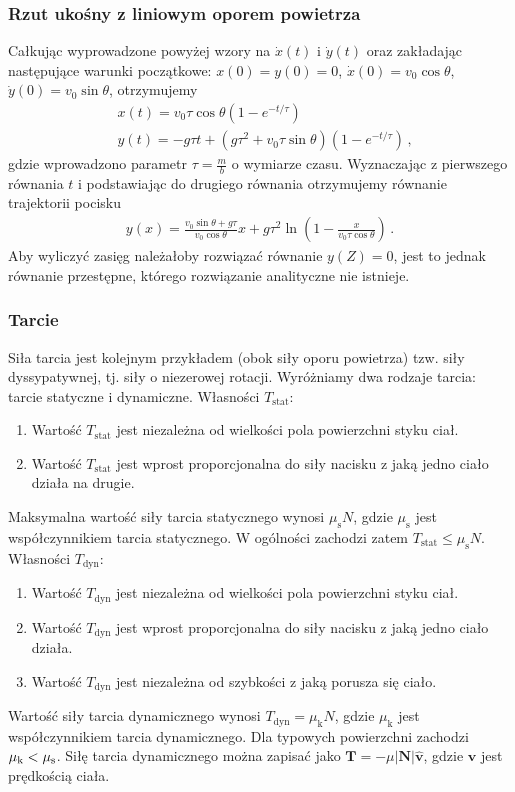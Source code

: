 \documentclass[../main.tex]{subfiles}
\begin{document}
\subsubsection*{Rzut ukośny z liniowym oporem powietrza}
Całkując wyprowadzone powyżej wzory na \(\dot x(t)\) i \(\dot y(t)\) oraz zakładając następujące
warunki początkowe: \(x(0)=y(0)=0\), \(\dot x(0)=v_0\cos\theta\), \(\dot y(0)=v_0\sin\theta\),
otrzymujemy
\begin{equation*}
\begin{split}
    &x(t)=v_0\tau\cos\theta\left(1-e^{-t/\tau}\right)\\
    &y(t)=-g\tau t+(g\tau^2+v_0\tau\sin\theta)\left(1-e^{-t/\tau}\right)\,,
\end{split}
\end{equation*}
gdzie wprowadzono parametr \(\tau=\frac{m}{b}\) o wymiarze czasu. Wyznaczając z pierwszego równania
\(t\) i podstawiając do drugiego równania otrzymujemy równanie trajektorii pocisku
\begin{equation*}
\begin{split}
    y(x)=\frac{v_0\sin\theta+g\tau}{v_0\cos\theta}x+g\tau^2\ln\left(1-\frac{x}{v_0\tau\cos\theta}\right)\,.
\end{split}
\end{equation*}
Aby wyliczyć zasięg należałoby rozwiązać równanie \(y(Z)=0\), jest to jednak równanie przestępne,
którego rozwiązanie analityczne nie istnieje.
\subsubsection{Tarcie}
Siła tarcia jest kolejnym przykładem (obok siły oporu powietrza) tzw. siły dyssypatywnej, tj. siły o
niezerowej rotacji. Wyróżniamy dwa rodzaje tarcia: tarcie statyczne i dynamiczne. Własności
\(T_\text{stat}\):
\begin{enumerate}
    \item Wartość \(T_\text{stat}\) jest niezależna od wielkości pola powierzchni styku ciał.
    \item Wartość \(T_\text{stat}\) jest wprost proporcjonalna do siły nacisku z jaką jedno ciało
    działa na drugie.
\end{enumerate}
Maksymalna wartość siły tarcia statycznego wynosi \(\mu_\text{s}N\), gdzie \(\mu_\text{s}\) jest
współczynnikiem tarcia statycznego. W ogólności zachodzi zatem \(T_\text{stat}\leq\mu_\text{s}N\).
Własności \(T_\text{dyn}\):
\begin{enumerate}
    \item Wartość \(T_\text{dyn}\) jest niezależna od wielkości pola powierzchni styku ciał.
    \item Wartość \(T_\text{dyn}\) jest wprost proporcjonalna do siły nacisku z jaką jedno ciało
    działa.
    \item Wartość \(T_\text{dyn}\) jest niezależna od szybkości z jaką porusza się ciało.
\end{enumerate}
Wartość siły tarcia dynamicznego wynosi \(T_\text{dyn}=\mu_\text{k}N\), gdzie \(\mu_\text{k}\) jest
współczynnikiem tarcia dynamicznego. Dla typowych powierzchni zachodzi \(\mu_\text k<\mu_\text s\).
Siłę tarcia dynamicznego można zapisać jako \(\mathbf{T}=-\mu |\mathbf{N}|\mathbf{\hat{v}}\), gdzie
\(\mathbf{v}\) jest prędkością ciała.
\end{document}
